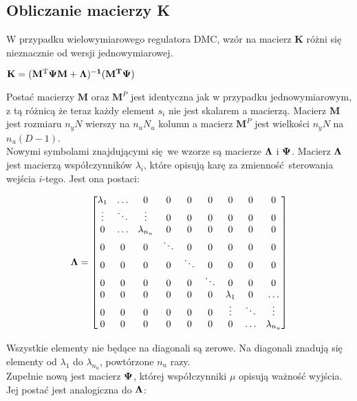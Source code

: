 \subsection{Obliczanie macierzy \bf{K}}
\label{pro_dmc_impl_macierze}

W przypadku wielowymiarowego regulatora DMC, wzór na macierz \textbf{K}
różni się nieznacznie od wersji jednowymiarowej.

\begin{center}
    $\bf{K} = (M^{\mathrm{T}} \Psi M + \Lambda)^{-1} (M^{T} \Psi)\/$
\end{center}

Postać macierzy $\textbf{M}$ oraz $\textbf{M}^{P}$ jest identyczna jak w przypadku
jednowymiarowym, z tą różnicą że teraz każdy element $s_{i}$ nie jest skalarem
a macierzą. 
Macierz $\textbf{M}$ jest rozmiaru $n_{y} N $ wierszy na $n_{u} N_{u}$ kolumn a macierz
$\textbf{M}^{P}$ jest wielkości $n_{y}N$ na $n_{u}(D -1)$.\\

Nowymi symbolami znajdującymi się we wzorze są macierze $\bf{} \Lambda \/$ i $\bf{} \Psi \/$.
Macierz $\bf{} \Lambda \/$ jest macierzą współczynników $\lambda_{i}$, które opisują karę
za zmienność sterowania wejścia $i$-tego. Jest ona postaci:

\[
\bf{} \Lambda \/ =
\begin{bmatrix}
    \lambda_{1} & \hdots & 0 & 0 & 0 & 0 & 0 & 0 & 0\\
    \vdots & \ddots & \vdots & 0 & 0 & 0 & 0 & 0 & 0  \\
    0 & \hdots & \lambda_{n_{u}} & 0 & 0 & 0 & 0 & 0 & 0 \\
    0 & 0 & 0 & \ddots & 0 & 0 & 0 & 0 & 0 \\
    0 & 0 & 0 & 0 & \ddots & 0 & 0 & 0 & 0 \\
    0 & 0 & 0 & 0 & 0 & \ddots & 0 & 0 & 0 \\
    0 & 0 & 0 & 0 & 0 & 0 & \lambda_{1} & 0  & \hdots  \\
    0 & 0 & 0 & 0 & 0 & 0 & \vdots & \ddots & \vdots \\
    0 & 0 & 0 & 0 & 0 & 0 & 0 & \hdots & \lambda_{n_{u}}\\
\end{bmatrix}
\]

Wszystkie elementy nie będące na diagonali są zerowe. Na diagonali znadują się
elementy od $\lambda_{1}$ do $\lambda_{n_{u}}$, powtórzone $n_{u}$ razy. \\

Zupełnie nową jest macierz $\bf{} \Psi \/$, której współczynniki $\mu$
opisują ważność wyjścia. Jej postać jest analogiczna do $\bf{} \Lambda \/$:

